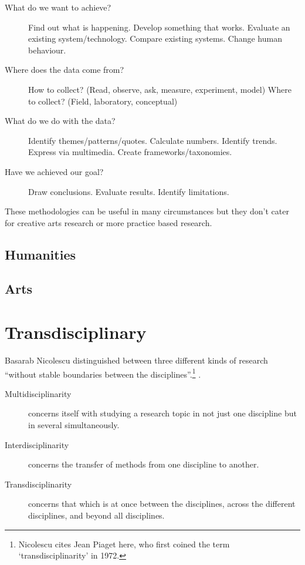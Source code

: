 \begin{description}
  \item [What do we want to achieve?] Find out what is happening. Develop something that works. Evaluate an existing system/technology. Compare existing systems. Change human behaviour.
  \item [Where does the data come from?] How to collect? (Read, observe, ask, measure, experiment, model) Where to collect? (Field, laboratory, conceptual)
  \item [What do we do with the data?] Identify themes/patterns/quotes. Calculate numbers. Identify trends. Express via multimedia. Create frameworks/taxonomies.
  \item [Have we achieved our goal?] Draw conclusions. Evaluate results. Identify limitations.
\end{description}

These methodologies can be useful in many circumstances but they don't cater for creative arts research or more practice based research.


\subsection{Humanities}



\subsection{Arts}



\section{Transdisciplinary}

Basarab Nicolescu distinguished between three different kinds of research ``without stable boundaries between the disciplines''.\footnote{Nicolescu cites Jean Piaget here, who first coined the term `transdisciplinarity' in 1972.} \autocite{Nicolescu2010}.

\begin{description}
  \item [Multidisciplinarity]	concerns itself with studying a research topic in not just one discipline but in several simultaneously.
  \item [Interdisciplinarity]	concerns the transfer of methods from one discipline to another.
  \item [Transdisciplinarity]	concerns that which is at once between the disciplines, across the different disciplines, and beyond all disciplines.
\end{description}

